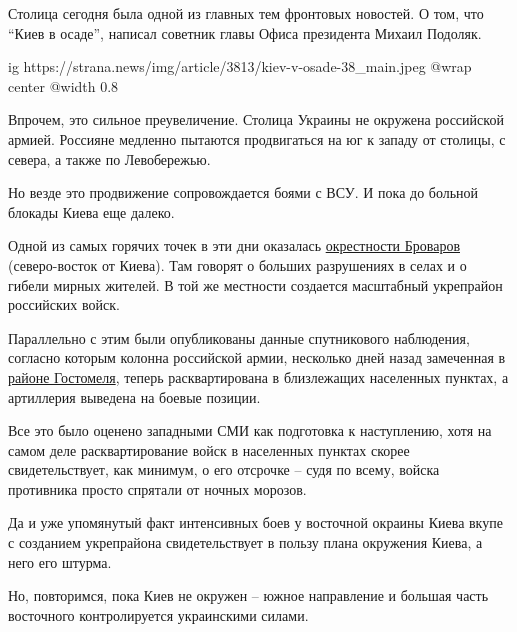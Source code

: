  
 
 
 
 

Столица сегодня была одной из главных тем фронтовых новостей. О том, что \enquote{Киев
в осаде}, написал советник главы Офиса президента Михаил Подоляк.

\ifcmt
  ig https://strana.news/img/article/3813/kiev-v-osade-38_main.jpeg
  @wrap center
  @width 0.8
\fi

Впрочем, это сильное преувеличение. Столица Украины не окружена российской
армией. Россияне медленно пытаются продвигаться на юг к западу от столицы, с
севера, а также по Левобережью.

Но везде это продвижение сопровождается боями с ВСУ. И пока до больной блокады
Киева еще далеко.

Одной из самых горячих точек в эти дни оказалась
\href{https://strana.news/news/381279-pod-brovarami-11-marta-idut-tjazhelye-boi.html}{окрестности
Броваров} (северо-восток от Киева). Там говорят о больших разрушениях в селах и
о гибели мирных жителей.  В той же местности создается масштабный укрепрайон
российских войск.

Параллельно с этим были опубликованы данные спутникового наблюдения, согласно
которым колонна российской армии, несколько дней назад замеченная в
\href{https://strana.news/news/380250-hostomel-snova-pod-kontrolem-vrazheskoj-armii.html}{районе
Гостомеля}, теперь расквартирована в близлежащих населенных пунктах, а
артиллерия выведена на боевые позиции.

Все это было оценено западными СМИ как подготовка к наступлению, хотя на самом
деле расквартирование войск в населенных пунктах скорее свидетельствует, как
минимум, о его отсрочке – судя по всему, войска противника просто спрятали от
ночных морозов.

Да и уже упомянутый факт интенсивных боев у восточной окраины Киева вкупе с
созданием укрепрайона свидетельствует в пользу плана окружения Киева, а него
его штурма.

Но, повторимся, пока Киев не окружен – южное направление и большая часть
восточного контролируется украинскими силами.
